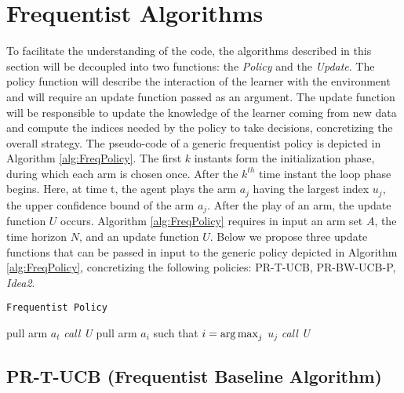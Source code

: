 \section{Frequentist Algorithms}
To facilitate the understanding of the code, the algorithms described in this section will be decoupled into two functions: the \emph{Policy} and the \emph{Update}. The policy function will describe the interaction of the learner with the environment and will require an update function passed as an argument. The update function will be responsible to update the knowledge of the learner coming from new data and compute the indices needed by the policy to take decisions, concretizing the overall strategy. The pseudo-code of a generic frequentist policy is depicted in Algorithm \ref{alg:FreqPolicy}.  The first $k$ instants form the initialization phase, during which  each arm is chosen once. After the $k^{th}$ time instant the loop phase begins. Here, at time t, the agent plays the arm $a_j$ having the largest index $u_j$, the upper confidence bound of the arm $a_j$. After the play of an arm, the update function $U$ occurs.
Algorithm \ref{alg:FreqPolicy} requires in input an arm set $A$, the time horizon $N$, and an update function $U$. Below we propose three update functions that can be passed in input to the generic policy depicted in Algorithm \ref{alg:FreqPolicy}, concretizing the following policies: PR-T-UCB, PR-BW-UCB-P, \emph{Idea2}.

\begin{algorithm}[H]
	\caption{\texttt{Frequentist Policy}}
	\begin{scriptsize}
		\begin{algorithmic}[1]						
			 
			\State pull arm $a_t$\;
			\State \emph{call U}\;
			\EndFor
			 
			\State pull arm $a_i$ such that  $i = \operatorname*{arg\,max}_j$ $u_j $\;
			\State \emph{call U}\;
			\EndFor
			\EndFunction			
		\end{algorithmic}
	\end{scriptsize}
	\label{alg:FreqPolicy}
\end{algorithm}



\subsection{PR-T-UCB (Frequentist Baseline Algorithm)}

